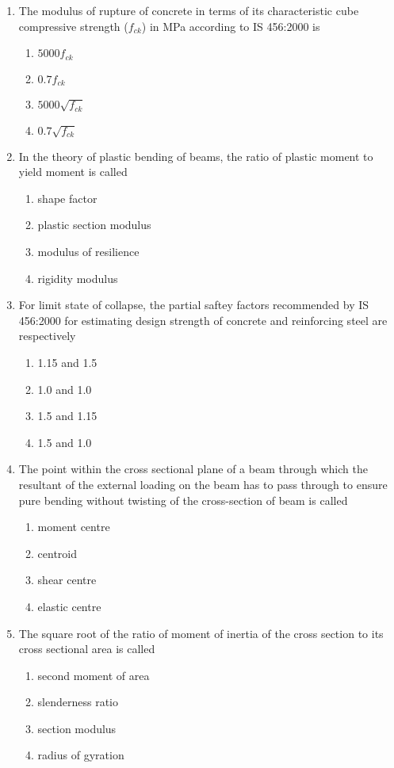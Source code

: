 \documentclass[journal,12pt,twocolumn]{IEEEtran}
\theoremstyle{remark}
\begin{document}
\begin{enumerate}
\item The modulus of rupture of concrete in terms of its characteristic cube compressive strength ($f_{ck}$) in MPa according to IS 456:2000 is
	\begin{enumerate}
		\item $5000f_{ck}$
		\item $0.7f_{ck}$
		\item $5000\sqrt{f_{ck}}$
		\item $0.7\sqrt{f_{ck}}$
	\end{enumerate}


\item In the theory of plastic bending of beams, the ratio of plastic moment to yield moment is called
	\begin{enumerate}
		\item shape factor
		\item plastic section modulus
		\item modulus of resilience
		\item rigidity modulus
	\end{enumerate}

\item For limit state of collapse, the partial saftey factors recommended by IS 456:2000 for estimating design strength of concrete and reinforcing steel are respectively
	\begin{enumerate}
		\item 1.15 and 1.5
		\item 1.0 and 1.0
		\item 1.5 and 1.15
		\item 1.5 and 1.0
	\end{enumerate}




\item The point within the cross sectional plane of a beam through which the resultant of the external loading on the beam has to pass through to ensure pure bending without twisting of the cross-section of beam is called
	\begin{enumerate}
		\item moment centre
		\item centroid
		\item shear centre
		\item elastic centre
	\end{enumerate}

\item The square root of the ratio of moment of inertia of the cross section to its cross sectional area is called
	\begin{enumerate}
		\item second moment of area
		\item slenderness ratio
		\item section modulus
		\item radius of gyration
	\end{enumerate}


\end{enumerate}
\end{document}

